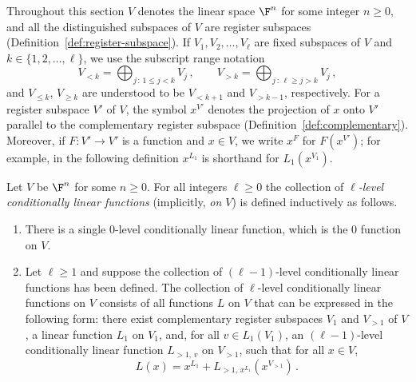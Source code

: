 Throughout this section $V$ denotes the linear space $\F^n$ for some integer $n \ge 0$, and all the distinguished subspaces of $V$ are register subspaces (Definition~\ref{def:register-subspace}). If $V_1, V_2, \dots, V_\ell$ are fixed subspaces of $V$ and $k \in \{1, 2, \dots, \ell\}$, we use the subscript range notation
\[
	V_{<k} = \bigoplus_{j\,:\,1 \le j < k} V_j\,, \qquad V_{>k} = \bigoplus_{j\,:\,\ell \ge j > k} V_j\,,
\]
and $V_{\le k}$, $V_{\ge k}$ are understood to be $V_{<k+1}$ and $V_{>k-1}$, respectively. For a register subspace $V'$ of $V$, the symbol $x^{V'}$ denotes the projection of $x$ onto $V'$ parallel to the complementary register subspace (Definition~\ref{def:complementary}). Moreover, if $F \colon V' \to V'$ is a function and $x \in V$, we write $x^F$ for $F(x^{V'})$; for example, in the following definition $x^{L_1}$ is shorthand for $L_1(x^{V_1})$.

\begin{definition}\label{def:cl-func}
	\leanok
	Let $V$ be $\F^n$ for some $n \ge 0$. For all integers $\ell \ge 0$ the collection of \emph{$\ell$-level conditionally linear functions} (implicitly, \emph{on $V$}) is defined inductively as follows.
	\begin{enumerate}
		\item There is a single $0$-level conditionally linear function, which is the $0$ function on $V$.
		\item Let $\ell \ge 1$ and suppose the collection of $(\ell-1)$-level conditionally linear functions has been defined. The collection of $\ell$-level conditionally linear functions on $V$ consists of all functions $L$ on $V$ that can be expressed in the following form: there exist complementary register subspaces $V_1$ and $V_{>1}$ of $V$, a linear function $L_1$ on $V_1$, and, for all $v \in L_1(V_1)$, an $(\ell-1)$-level conditionally linear function $L_{>1,\,v}$ on $V_{>1}$, such that for all $x \in V$,
		\[
			L(x) = x^{L_1} + L_{>1,\,x^{L_1}}(x^{V_{>1}})\,.
		\]
	\end{enumerate}
\end{definition}

